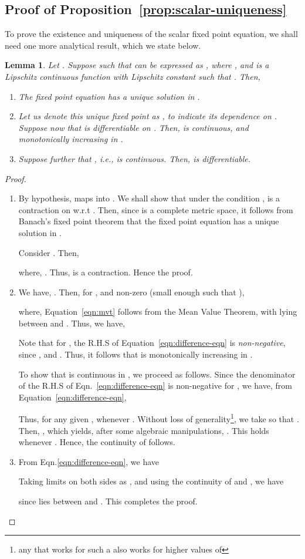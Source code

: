 \documentclass[12pt, draftclsnofoot, onecolumn]{IEEEtran}
\newtheorem{lemma}{Lemma}
\begin{document}
\subsection{Proof of Proposition~\ref{prop:scalar-uniqueness}}
\label{subsec:proof-scalar-uniqueness}
To prove the existence and uniqueness of the scalar fixed point equation, we shall need one more analytical result, which we state below.

\begin{lemma}
\label{lem:scalar-uniqueness-lipschitz}
Let . Suppose  such that  can be expressed as , where , and  is a Lipschitz continuous function with Lipschitz constant  such that . Then,
\begin{enumerate}
\item The fixed point equation  has a unique solution in .
\item Let us denote this unique fixed point as , to indicate its dependence on . Suppose now that  is differentiable on . Then,  is continuous, and monotonically increasing in . 
\item Suppose further that , i.e.,  is continuous. Then,  is differentiable. 
\end{enumerate}
\end{lemma} 

\begin{proof}
\begin{enumerate}
\item By hypothesis,  maps  into . We shall show that under the condition ,  is a contraction on  w.r.t . Then, since  is a complete metric space, it follows from Banach's fixed point theorem that the fixed point equation has a unique solution in . 

Consider . Then,

where, . Thus,  is a contraction. Hence the proof. 
\item We have, . Then, for , and non-zero  (small enough such that ),

where, Equation~\ref{eqn:mvt} follows from the Mean Value Theorem, with  lying between  and . Thus, we have,

Note that for , the R.H.S of Equation~\eqref{eqn:difference-eqn} is \emph{non-negative}, since , and . Thus, it follows that  is monotonically increasing in . 

To show that  is continuous in , we proceed as follows. Since the denominator of the R.H.S of Eqn.~\ref{eqn:difference-eqn} is non-negative for , we have, from Equation~\ref{eqn:difference-eqn}, 

Thus, for any given ,  whenever . Without loss of generality\footnote{any  that works for such a  also works for higher values of }, we take  so that . Then, , which yields, after some algebraic manipulations, . This holds whenever . Hence, the continuity of  follows.


\item From Eqn.\ref{eqn:difference-eqn}, we have
 
Taking limits on both sides as , and using the continuity of  and , we have

since  lies between  and . This completes the proof. 
\end{enumerate}
\end{proof}
\end{document}
